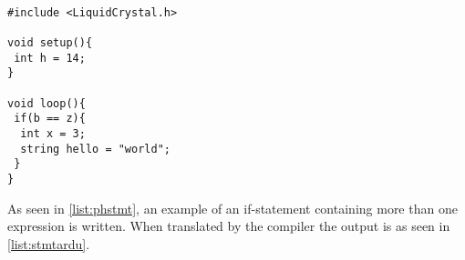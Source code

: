 \begin{lstlisting}[caption=Example of an if-statement in the Arduino language translated by the compiler from PH, label=list:stmtardu]

#include <LiquidCrystal.h>

void setup(){
 int h = 14;
}

void loop(){
 if(b == z){
  int x = 3;
  string hello = "world";
 }
}
\end{lstlisting}

As seen in \ref{list:phstmt}, an example of an if-statement containing more than one expression is written. When translated by the compiler the output is as seen in \ref{list:stmtardu}.




